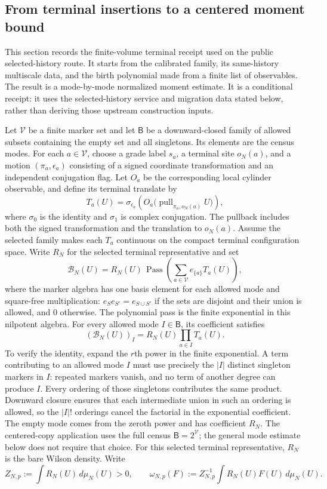 \subsection{From terminal insertions to a centered moment bound}\label{ex-selected-birth-receipt}

This section records the finite-volume terminal receipt used on the public selected-history route. It starts from the calibrated family, its same-history multiscale data, and the birth polynomial made from a finite list of observables. The result is a mode-by-mode normalized moment estimate. It is a conditional receipt: it uses the selected-history service and migration data stated below, rather than deriving those upstream construction inputs.

Let $\mathcal V$ be a finite marker set and let $\mathsf B$ be a downward-closed family of allowed subsets containing the empty set and all singletons. Its elements are the census modes. For each $a\in\mathcal V$, choose a grade label $s_a$, a terminal site $o_N(a)$, and a motion $(\pi_a,\epsilon_a)$ consisting of a signed coordinate transformation and an independent conjugation flag. Let $O_a$ be the corresponding local cylinder observable, and define its terminal translate by
\[
 T_a(U)=\sigma_{\epsilon_a}\!\left(O_a\bigl(\operatorname{pull}_{\pi_a,o_N(a)}U\bigr)\right),
\]
where $\sigma_0$ is the identity and $\sigma_1$ is complex conjugation. The pullback includes both the signed transformation and the translation to $o_N(a)$.
Assume the selected family makes each $T_a$ continuous on the compact terminal configuration space. Write $R_N$ for the selected terminal representative and set
\[
 \mathcal B_N(U)=R_N(U)\,\operatorname{Pass}\!\left(
    \sum_{a\in\mathcal V} e_{\{a\}}T_a(U)\right),
\]
where the marker algebra has one basis element for each allowed mode and square-free multiplication: $e_S e_{S'}=e_{S\cup S'}$ if the sets are disjoint and their union is allowed, and $0$ otherwise. The polynomial pass is the finite exponential in this nilpotent algebra. For every allowed mode $I\in\mathsf B$, its coefficient satisfies
\[
 (\mathcal B_N(U))_I=R_N(U)\prod_{a\in I}T_a(U).
\]
To verify the identity, expand the $r$th power in the finite exponential. A term contributing to an allowed mode $I$ must use precisely the $|I|$ distinct singleton markers in $I$: repeated markers vanish, and no term of another degree can produce $I$. Every ordering of those singletons contributes the same product. Downward closure ensures that each intermediate union in such an ordering is allowed, so the $|I|!$ orderings cancel the factorial in the exponential coefficient. The empty mode comes from the zeroth power and has coefficient $R_N$. The centered-copy application uses the full census $\mathsf B=2^{\mathcal V}$; the general mode estimate below does not require that choice.
For this selected terminal representative, $R_N$ is the bare Wilson density. Write
\[
 Z_{N,p}:=\int R_N(U)\,d\mu_N(U)>0,
 \qquad
 \omega_{N,p}(F):=Z_{N,p}^{-1}\int R_N(U)F(U)\,d\mu_N(U).
\]

